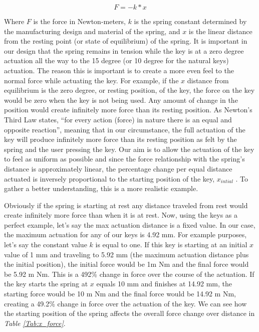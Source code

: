 \begin{equation} \label{spring_force}
  F = -k * x
\end{equation}

Where $ F $ is the force in Newton-meters, $ k $ is the spring constant determined by the manufacturing design and material of the spring, and $ x $ is the linear distance from the resting point (or state of equilibrium) of the spring. It is important in our design that the spring remains in tension while the key is at a zero degree actuation all the way to the 15 degree (or 10 degree for the natural keys) actuation. The reason this is important is to create a more even feel to the normal force while actuating the key. For example, if the $ x $ distance from equilibrium is the zero degree, or resting position, of the key, the force on the key would be zero when the key is not being used. Any amount of change in the position would create infinitely more force than its resting position. As Newton’s Third Law states, “for every action (force) in nature there is an equal and opposite reaction”, meaning that in our circumstance, the full actuation of the key will produce infinitely more force than its resting position as felt by the spring and the user pressing the key. Our aim is to allow the actuation of the key to feel as uniform as possible and since the force relationship with the spring’s distance is approximately linear, the percentage change per equal distance actuated is inversely proportional to the starting position of the key, $ x_{intial} $ . To gather a better understanding, this is a more realistic example.

Obviously if the spring is starting at rest any distance traveled from rest would create infinitely more force than when it is at rest. Now, using the keys as a perfect example, let’s say the max actuation distance is a fixed value. In our case, the maximum actuation for any of our keys is 4.92 mm. For example purposes, let’s say the constant value $ k $ is equal to one. If this key is starting at an initial $ x $ value of 1 mm and traveling to 5.92 mm (the maximum actuation distance plus the initial position), the initial force would be 1m Nm and the final force would be 5.92 m Nm. This is a 492\% change in force over the course of the actuation. If the key starts the spring at $ x $ equals 10 mm and finishes at 14.92 mm, the starting force would be 10 m Nm and the final force would be 14.92 m Nm, creating a 49.2\% change in force over the actuation of the key. We can see how the starting position of the spring affects the overall force change over distance in \textit{Table \ref{Tab:x_force}}.

